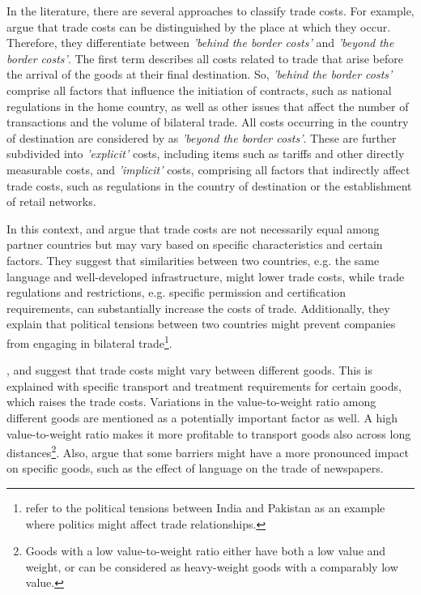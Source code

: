 In the literature, there are several approaches to classify trade costs. For example, \textcite{KHAN20111341} argue that trade costs can be distinguished by the place at which they occur. Therefore, they differentiate between \textit{'behind the border costs'} and \textit{'beyond the border costs'}. The first term describes all costs related to trade that arise before the arrival of the goods at their final destination. So, \textit{'behind the border costs'} comprise all factors that influence the initiation of contracts, such as national regulations in the home country, as well as other issues that affect the number of transactions and the volume of bilateral trade. All costs occurring in the country of destination are considered by \textcite{KHAN20111341} as \textit{'beyond the border costs'}. These are further subdivided into \textit{'explicit'} costs, including items such as tariffs and other directly measurable costs, and \textit{'implicit'} costs, comprising all factors that indirectly affect trade costs, such as regulations in the country of destination or the establishment of retail networks.

In this context, \textcite{KHAN20111341} and \textcite{Anderson_2004} argue that trade costs are not necessarily equal among partner countries but may vary based on specific characteristics and certain factors. They suggest that similarities between two countries, e.g. the same language and well-developed infrastructure, might lower trade costs, while trade regulations and restrictions, e.g. specific permission and certification requirements, can substantially increase the costs of trade. Additionally, they explain that political tensions between two countries might prevent companies from engaging in bilateral trade\footnote{\textcite{KHAN20111341} refer to the political tensions between India and Pakistan as an example where politics might affect trade relationships.}. 

\textcite{Anderson_2004}, \textcite{CHEN2011206} and \textcite{KHAN20111341} suggest that trade costs might vary between different goods. This is explained with specific transport and treatment requirements for certain goods, which raises the trade costs. Variations in the value-to-weight ratio among different goods are mentioned as a potentially important factor as well. A high value-to-weight ratio makes it more profitable to transport goods also across long distances\footnote{Goods with a low value-to-weight ratio either have both a low value and weight, or can be considered as heavy-weight goods with a comparably low value.}. Also, \textcite{CHEN2011206} argue that some barriers might have a more pronounced impact on specific goods, such as the effect of language on the trade of newspapers.

